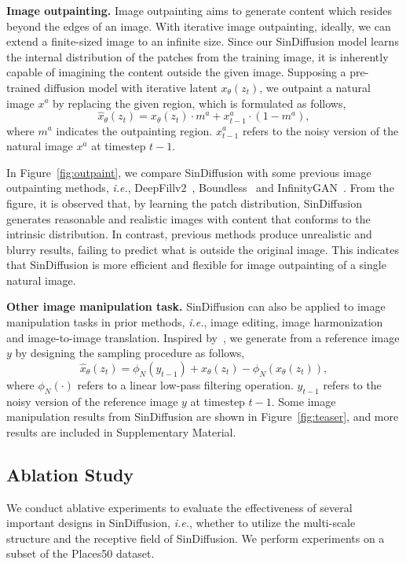 \documentclass[10pt,twocolumn,letterpaper]{article}
\begin{document}
\noindent \textbf{Image outpainting.}
Image outpainting aims to generate content which resides beyond the edges of an image.
With iterative image outpainting, ideally, we can extend a finite-sized image to an infinite size.
Since our SinDiffusion model learns the internal distribution of the patches from the training image, it is inherently capable of imagining the content outside the given image.
Supposing a pre-trained diffusion model with iterative latent $x_\theta(z_t)$, we outpaint a natural image $x^a$ by replacing the given region, which is formulated as follows,
\begin{equation}
    \hat{x}_\theta(z_t) = x_\theta(z_t) \cdot m^a + x^a_{t-1} \cdot (1 - m^a),
\end{equation}
where $m^a$ indicates the outpainting region.
$x^a_{t-1}$ refers to the noisy version of the natural image $x^a$ at timestep $t-1$.

In Figure~\ref{fig:outpaint}, we compare SinDiffusion with some previous image outpainting methods, \emph{i.e.}, DeepFillv2~\cite{yu2019free}, Boundless~\cite{teterwak2019boundless} and InfinityGAN~\cite{lin2021infinitygan}.
From the figure, it is observed that, by learning the patch distribution, SinDiffusion generates reasonable and realistic images with content that conforms to the intrinsic distribution. 
In contrast, previous methods produce unrealistic and blurry results, failing to predict what is outside the original image.
This indicates that SinDiffusion is more efficient and flexible for image outpainting of a single natural image.

\noindent \textbf{Other image manipulation task.}
SinDiffusion can also be applied to image manipulation tasks in prior methods, \emph{i.e.}, image editing, image harmonization and image-to-image translation.
Inspired by~\cite{choi2021ilvr}, we generate from a reference image $y$ by designing the sampling procedure as follows,
\begin{equation}
    \hat{x}_\theta(z_t) = \phi_N(y_{t-1}) + x_\theta(z_t) - \phi_N(x_\theta(z_t)),
\end{equation}
where $\phi_N(\cdot)$ refers to a linear low-pass filtering operation.
$y_{t-1}$ refers to the noisy version of the reference image $y$ at timestep $t-1$.
Some image manipulation results from SinDiffusion are shown in Figure~\ref{fig:teaser}, and more results are included in Supplementary Material.

\subsection{Ablation Study}
We conduct ablative experiments to evaluate the effectiveness of several important designs in SinDiffusion, \emph{i.e.}, whether to utilize the multi-scale structure and the receptive field of SinDiffusion. We perform experiments on a subset of the Places50 dataset.
\end{document}

